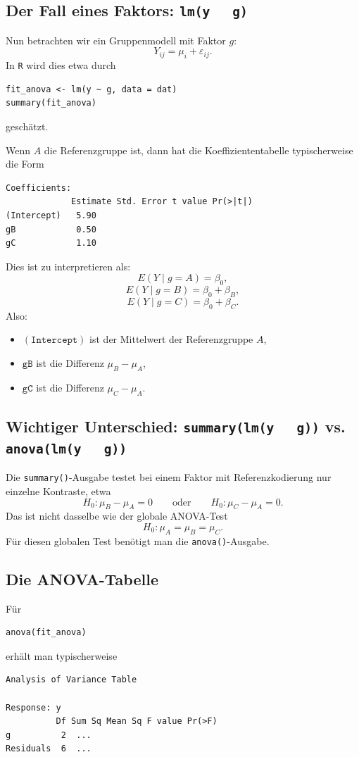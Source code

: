 \documentclass[10pt, letterpaper]{article}
\begin{document}
\subsection{Der Fall eines Faktors: \texttt{lm(y ~ g)}}

Nun betrachten wir ein Gruppenmodell mit Faktor \(g\):
\[
Y_{ij}=\mu_i+\varepsilon_{ij}.
\]
In \texttt{R} wird dies etwa durch
\begin{verbatim}
fit_anova <- lm(y ~ g, data = dat)
summary(fit_anova)
\end{verbatim}
geschätzt.

Wenn \(A\) die Referenzgruppe ist, dann hat die Koeffiziententabelle typischerweise die Form
\begin{verbatim}
Coefficients:
             Estimate Std. Error t value Pr(>|t|)
(Intercept)   5.90
gB            0.50
gC            1.10
\end{verbatim}
Dies ist zu interpretieren als:
\[
E(Y\mid g=A)=\beta_0,
\]
\[
E(Y\mid g=B)=\beta_0+\beta_B,
\]
\[
E(Y\mid g=C)=\beta_0+\beta_C.
\]
Also:
\begin{itemize}
    \item \((\texttt{Intercept})\) ist der Mittelwert der Referenzgruppe \(A\),
    \item \(\texttt{gB}\) ist die Differenz \(\mu_B-\mu_A\),
    \item \(\texttt{gC}\) ist die Differenz \(\mu_C-\mu_A\).
\end{itemize}

\subsection{Wichtiger Unterschied: \texttt{summary(lm(y ~ g))} vs. \texttt{anova(lm(y ~ g))}}

Die \texttt{summary()}-Ausgabe testet bei einem Faktor mit Referenzkodierung nur einzelne Kontraste, etwa
\[
H_0:\mu_B-\mu_A=0
\qquad \text{oder} \qquad
H_0:\mu_C-\mu_A=0.
\]
Das ist nicht dasselbe wie der globale ANOVA-Test
\[
H_0:\mu_A=\mu_B=\mu_C.
\]
Für diesen globalen Test benötigt man die \texttt{anova()}-Ausgabe.

\subsection{Die ANOVA-Tabelle}

Für
\begin{verbatim}
anova(fit_anova)
\end{verbatim}
erhält man typischerweise
\begin{verbatim}
Analysis of Variance Table

Response: y
          Df Sum Sq Mean Sq F value Pr(>F)
g          2  ...
Residuals  6  ...
\end{verbatim}
\end{document}

